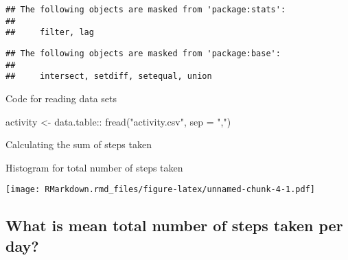 \documentclass[
]{article}
\newenvironment{Shaded}{\begin{snugshade}}{\end{snugshade}}
\newcommand{\AttributeTok}[1]{\textcolor[rgb]{0.77,0.63,0.00}{#1}}
\newcommand{\DecValTok}[1]{\textcolor[rgb]{0.00,0.00,0.81}{#1}}
\newcommand{\FunctionTok}[1]{\textcolor[rgb]{0.00,0.00,0.00}{#1}}
\newcommand{\NormalTok}[1]{#1}
\newcommand{\OtherTok}[1]{\textcolor[rgb]{0.56,0.35,0.01}{#1}}
\newcommand{\SpecialCharTok}[1]{\textcolor[rgb]{0.00,0.00,0.00}{#1}}
\newcommand{\StringTok}[1]{\textcolor[rgb]{0.31,0.60,0.02}{#1}}
\begin{document}
\begin{verbatim}
## The following objects are masked from 'package:stats':
## 
##     filter, lag
\end{verbatim}

\begin{verbatim}
## The following objects are masked from 'package:base':
## 
##     intersect, setdiff, setequal, union
\end{verbatim}

Code for reading data sets

\begin{Shaded}
\begin{Highlighting}[]
\NormalTok{activity }\OtherTok{\textless{}{-}}\NormalTok{ data.table}\SpecialCharTok{::} \FunctionTok{fread}\NormalTok{(}\StringTok{"activity.csv"}\NormalTok{, }\AttributeTok{sep =} \StringTok{","}\NormalTok{)}
\end{Highlighting}
\end{Shaded}

Calculating the sum of steps taken

\begin{Shaded}
\end{Shaded}

Histogram for total number of steps taken

\begin{Shaded}
\end{Shaded}

\texttt{[image: RMarkdown.rmd\_files/figure-latex/unnamed-chunk-4-1.pdf]}

\hypertarget{what-is-mean-total-number-of-steps-taken-per-day}{%
\subsection{What is mean total number of steps taken per
day?}\label{what-is-mean-total-number-of-steps-taken-per-day}}
\end{document}
